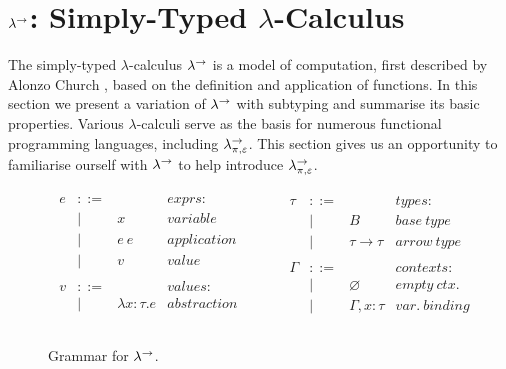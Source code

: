 \section{ $\lambda^{\rightarrow}$: Simply-Typed $\lambda$-Calculus}

The simply-typed $\lambda$-calculus $\lambda^{\rightarrow}$ is a model of computation, first described by Alonzo Church \cite{church40}, based on the definition and application of functions. In this section we present a variation of $\lambda^{\rightarrow}$ with subtyping and summarise its basic properties. Various $\lambda$-calculi serve as the basis for numerous functional programming languages, including $\lambda^{\rightarrow}_{\pi, \varepsilon}$. This section gives us an opportunity to familiarise ourself with $\lambda^{\rightarrow}$ to help introduce $\lambda^{\rightarrow}_{\pi, \varepsilon}$.

\begin{figure}[h]
\vspace{-5pt}

\[
\begin{array}{lll}

\begin{array}{lllr}

e & ::= & ~ & exprs: \\
	& | & x & variable \\
	& | & e~e & application \\
	& | & v & value \\
	&&\\
	
v & ::= & ~ & values: \\
	& | & \lambda x: \tau . e & abstraction \\
	&&\\
	
\end{array}

& ~~~~~~ &

\begin{array}{lllr}

\tau & ::= & ~ & types: \\
	& | & B & base~type \\
	& | & \tau \rightarrow \tau & arrow~type \\
	&&\\
	
\Gamma & ::= & ~ & contexts: \\
	& | & \varnothing & empty~ctx. \\
	& | & \Gamma, x: \tau & var.~binding \\
	&&\\
	
\end{array}

\end{array}
\]

\vspace{-12pt}
\caption{Grammar for $\lambda^{\rightarrow}$.}
\label{This is the label.}
\end{figure}

